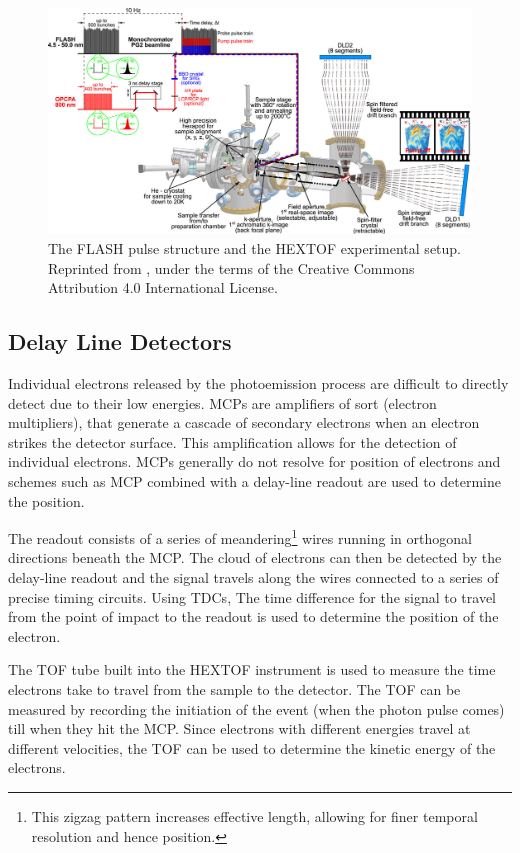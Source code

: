 \begin{figure}
    \centering
    \includegraphics[width=1\linewidth]{images/2024-08-27-10-50-01.png}
    \caption{The \gls{FLASH} pulse structure and the \gls{HEXTOF} experimental setup. Reprinted from \cite{kutnyakhovTimeMomentumresolvedPhotoemission2020}, under the terms of the Creative Commons Attribution 4.0 International License.}
    \label{fig:hex-tof}
\end{figure}


\subsection{Delay Line Detectors}\label{section:dld}
Individual electrons released by the photoemission process are difficult to directly detect due to their low energies. \Glspl{MCP} are amplifiers of sort (electron multipliers), that generate a cascade of secondary electrons when an electron strikes the detector surface. This amplification allows for the detection of individual electrons. \Glspl{MCP} generally do not resolve for position of electrons and schemes such as \gls{MCP} combined with a delay-line readout are used to determine the position. 

The readout consists of a series of meandering\footnote{This zigzag pattern increases effective length, allowing for finer temporal resolution and hence position.} wires running in orthogonal directions beneath the \gls{MCP}. The cloud of electrons can then be detected by the delay-line readout and the signal travels along the wires connected to a series of precise timing circuits. Using \glspl{TDC}, The time difference for the signal to travel from the point of impact to the readout is used to determine the position of the electron.


The \gls{TOF} tube built into the \gls{HEXTOF} instrument is used to measure the time electrons take to travel from the sample to the detector. The \gls{TOF} can be measured by recording the initiation of the event (when the photon pulse comes) till when they hit the \gls{MCP}. Since electrons with different energies travel at different velocities, the \gls{TOF} can be used to determine the kinetic energy of the electrons. 

